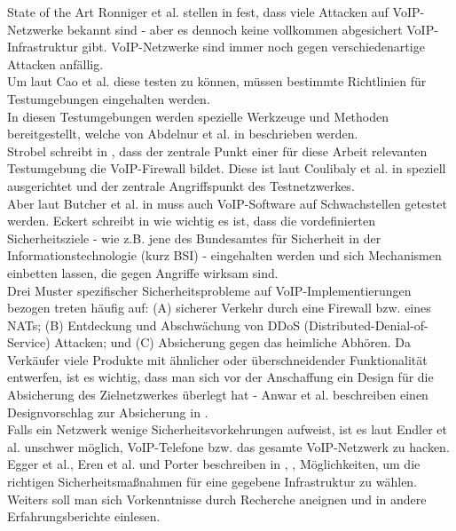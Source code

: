 \begin{section}{State of the Art}
Ronniger et al. stellen in \cite{Ronniger:2010:robflex}  fest, dass viele Attacken auf VoIP-Netzwerke bekannt sind - aber es dennoch keine vollkommen abgesichert VoIP-Infrastruktur gibt. VoIP-Netzwerke sind immer noch gegen verschiedenartige Attacken anfällig. \\
Um laut Cao et al. \cite{CaoWang:2009:DevLab} diese testen zu können, müssen bestimmte Richtlinien für Testumgebungen eingehalten
werden. \\
In diesen Testumgebungen werden spezielle Werkzeuge und Methoden bereitgestellt, welche von Abdelnur et al. in \cite{Abdelnur:2006:voipass} beschrieben werden.  \\
Strobel schreibt in \cite{strobel:2003:firewalls}, dass der zentrale Punkt einer für diese Arbeit relevanten Testumgebung die VoIP-Firewall bildet. Diese ist laut Coulibaly et al. in \cite{Coulibaly:2010:secvoipb}  speziell ausgerichtet und der zentrale Angriffspunkt des Testnetzwerkes. \\
Aber laut Butcher et al. in  \cite{Butcher:2007:SecChall}   muss auch VoIP-Software auf Schwachstellen getestet werden. 
Eckert schreibt in  \cite{eckert:2009:sicherheit} wie wichtig es ist, dass die vordefinierten Sicherheitsziele - wie z.B. jene des Bundesamtes für Sicherheit in der Informationstechnologie (kurz BSI) - eingehalten werden und sich
Mechanismen einbetten lassen, die gegen Angriffe wirksam sind. 
\\
Drei Muster spezifischer Sicherheitsprobleme auf VoIP-Implementierungen bezogen treten
häufig auf: (A) sicherer Verkehr durch eine Firewall bzw. eines NATs; (B) Entdeckung und
Abschwächung von DDoS (Distributed-Denial-of-Service) Attacken; und (C) Absicherung
gegen das heimliche Abhören. Da Verkäufer viele Produkte mit ähnlicher oder
überschneidender Funktionalität entwerfen, ist es wichtig, dass man sich vor der
Anschaffung ein Design für die Absicherung des Zielnetzwerkes überlegt hat - Anwar et al. beschreiben einen Designvorschlag zur Absicherung in \cite{Anwar:2006:despatt} .\\
Falls ein Netzwerk wenige Sicherheitsvorkehrungen aufweist, ist es laut Endler et al. \cite{endler:2006:hacking} unschwer möglich, VoIP-Telefone bzw. das gesamte VoIP-Netzwerk zu hacken.
 \\
Egger et al., Eren et al. und Porter beschreiben in \cite{Egger:2008:linVoip} ,\cite{eren:2007:voip} ,\cite{porter:2006:practicalvoip} Möglichkeiten, um die richtigen Sicherheitsmaßnahmen für eine gegebene Infrastruktur zu wählen. Weiters soll man sich Vorkenntnisse durch Recherche aneignen und in andere Erfahrungsberichte einlesen. \\

\end{section}
\pagebreak
